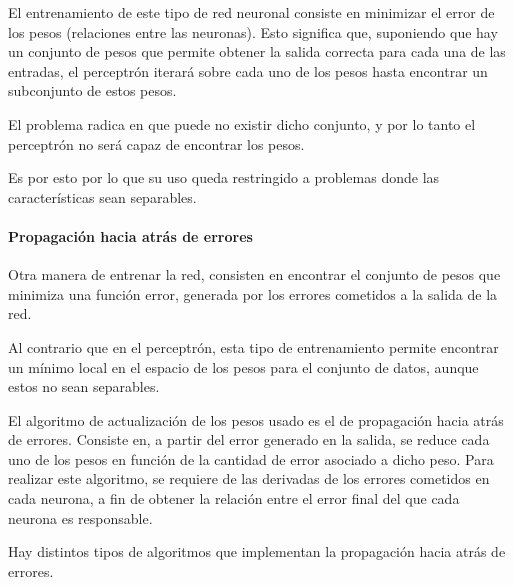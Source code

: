 El entrenamiento de este tipo de red neuronal consiste en minimizar el error de los pesos (relaciones entre las neuronas). Esto significa que, suponiendo que hay un conjunto de pesos que permite obtener la salida correcta para cada una de las entradas, el perceptrón iterará sobre cada uno de los pesos hasta encontrar un subconjunto de estos pesos.

El problema radica en que puede no existir dicho conjunto, y por lo tanto el perceptrón no será capaz de encontrar los pesos.

Es por esto por lo que su uso queda restringido a problemas donde las características sean separables.

\paragraph{Propagación hacia atrás de errores}
Otra manera de entrenar la red, consisten en encontrar el conjunto de pesos que minimiza una función error, generada por los errores cometidos a la salida de la red.

Al contrario que en el perceptrón, esta tipo de entrenamiento permite encontrar un mínimo local en el espacio de los pesos para el conjunto de datos, aunque estos no sean separables.

El algoritmo de actualización de los pesos usado es el de propagación hacia atrás de errores. Consiste en, a partir del error generado en la salida, se reduce cada uno de los pesos en función de la cantidad de error asociado a dicho peso. Para realizar este algoritmo, se requiere de las derivadas de los errores cometidos en cada neurona, a fin de obtener la relación entre el error final del que cada neurona es responsable.

Hay distintos tipos de algoritmos \cite{gradient_descent} que implementan la propagación hacia atrás de errores.


